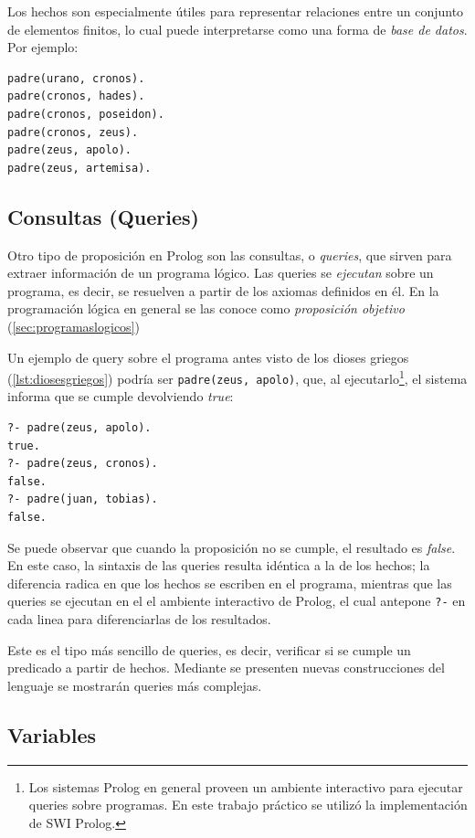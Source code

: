 \documentclass[12pt,titlepage]{article}
\begin{document}
Los hechos son especialmente útiles para representar relaciones entre un conjunto de elementos finitos, lo cual puede interpretarse como una forma de \emph{base de datos}. Por ejemplo:
\begin{lstlisting}[label=lst:diosesgriegos]
padre(urano, cronos).
padre(cronos, hades).
padre(cronos, poseidon).
padre(cronos, zeus).
padre(zeus, apolo).
padre(zeus, artemisa).
\end{lstlisting}

\subsection{Consultas (Queries)}

Otro tipo de proposición en Prolog son las consultas, o \emph{queries}, que sirven para extraer información de un programa lógico. Las queries se \emph{ejecutan} sobre un programa, es decir, se resuelven a partir de los axiomas definidos en él. En la programación lógica en general se las conoce como \emph{proposición objetivo} (\ref{sec:programaslogicos})

Un ejemplo de query sobre el programa antes visto de los dioses griegos (\ref{lst:diosesgriegos}) podría ser \lstinline|padre(zeus, apolo)|, que, al ejecutarlo\footnote{Los sistemas Prolog en general proveen un ambiente interactivo para ejecutar queries sobre programas. En este trabajo práctico se utilizó la implementación de SWI Prolog.}, el sistema informa que se cumple devolviendo \emph{true}:
\begin{lstlisting}
?- padre(zeus, apolo).
true.
?- padre(zeus, cronos).
false.
?- padre(juan, tobias).
false.
\end{lstlisting}

Se puede observar que cuando la proposición no se cumple, el resultado es \emph{false}. En este caso, la sintaxis de las queries resulta idéntica a la de los hechos; la diferencia radica en que los hechos se escriben en el programa, mientras que las queries se ejecutan en el el ambiente interactivo de Prolog, el cual antepone \lstinline|?-| en cada linea para diferenciarlas de los resultados.

Este es el tipo más sencillo de queries, es decir, verificar si se cumple un predicado a partir de hechos. Mediante se presenten nuevas construcciones del lenguaje se mostrarán queries más complejas.

\subsection{Variables}
\end{document}
